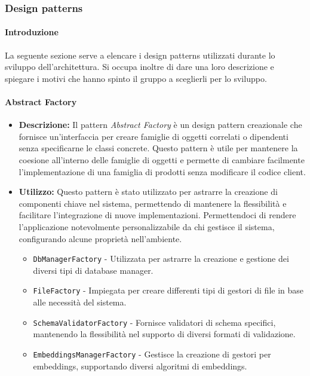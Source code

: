 \subsubsection{Design patterns}
\paragraph{Introduzione}
\par La seguente sezione serve a elencare i design patterns utilizzati durante lo sviluppo dell'architettura. Si occupa inoltre di dare una loro descrizione e spiegare i motivi che hanno spinto il gruppo a sceglierli per lo sviluppo.

\paragraph{Abstract Factory}
\begin{itemize}
    \item{\textbf{Descrizione:}} Il pattern \textit{Abstract Factory} è un design pattern creazionale che fornisce un'interfaccia per creare famiglie di oggetti correlati o dipendenti senza specificarne le classi concrete. Questo pattern è utile per mantenere la coesione all'interno delle famiglie di oggetti e permette di cambiare facilmente l'implementazione di una famiglia di prodotti senza modificare il codice client.
    \item{\textbf{Utilizzo:}} Questo pattern è stato utilizzato per astrarre la creazione di componenti chiave nel sistema, permettendo di mantenere la flessibilità e facilitare l'integrazione di nuove implementazioni. Permettendoci di rendere l'applicazione notevolmente personalizzabile da chi gestisce il sistema, configurando alcune proprietà nell'ambiente.
    \begin{itemize}
        \item \texttt{DbManagerFactory} - Utilizzata per astrarre la creazione e gestione dei diversi tipi di database manager.
        \item \texttt{FileFactory} - Impiegata per creare differenti tipi di gestori di file in base alle necessità del sistema.
        \item \texttt{SchemaValidatorFactory} - Fornisce validatori di schema specifici, mantenendo la flessibilità nel supporto di diversi formati di validazione.
        \item \texttt{EmbeddingsManagerFactory} - Gestisce la creazione di gestori per embeddings, supportando diversi algoritmi di embeddings.
    \end{itemize}
\end{itemize}

